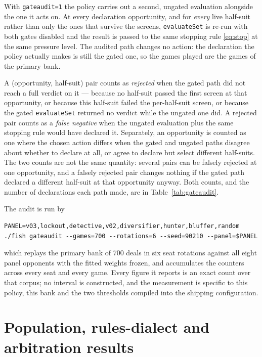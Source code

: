 \documentclass[11pt]{article}
\theoremstyle{definition}
\newcommand{\numHtHDeals}{700}
\begin{document}
With \texttt{gateaudit=1} the policy carries out a second, ungated evaluation
alongside the one it acts on. At every declaration opportunity, and for
\emph{every} live half-suit rather than only the ones that survive the screens,
\texttt{evaluateSet} is re-run with both gates disabled and the result is passed
to the same stopping rule \eqref{eq:stop} at the same pressure level. The
audited path changes no action: the declaration the policy actually makes is
still the gated one, so the games played are the games of the primary bank.

A (opportunity, half-suit) pair counts as \emph{rejected} when the gated path
did not reach a full verdict on it --- because no half-suit passed the
first screen at that opportunity, or because this half-suit failed the
per-half-suit screen, or because the gated \texttt{evaluateSet} returned no
verdict while the ungated one did. A rejected pair counts as a \emph{false
negative} when the ungated evaluation plus the same stopping rule would have
declared it. Separately, an opportunity is counted as one where the chosen
action differs when the gated and ungated paths disagree about whether to
declare at all, or agree to declare but select different half-suits. The two
counts are not the same quantity: several pairs can be falsely rejected at one
opportunity, and a falsely rejected pair changes nothing if the gated path
declared a different half-suit at that opportunity anyway. Both counts, and the
number of declarations each path made, are in Table~\ref{tab:gateaudit}.

The audit is run by

\begin{verbatim}
PANEL=v03,lockout,detective,v02,diversifier,hunter,bluffer,random
./fish gateaudit --games=700 --rotations=6 --seed=90210 --panel=$PANEL
\end{verbatim}

which replays the primary bank of \numHtHDeals{} deals in six seat rotations
against all eight panel opponents with the fitted weights frozen, and
accumulates the counters across every seat and every game. Every figure it
reports is an exact count over that corpus; no interval is constructed, and the
measurement is specific to this policy, this bank and the two thresholds
compiled into the shipping configuration.
\section{Population, rules-dialect and arbitration results}
\label{app:dialects}
\end{document}
